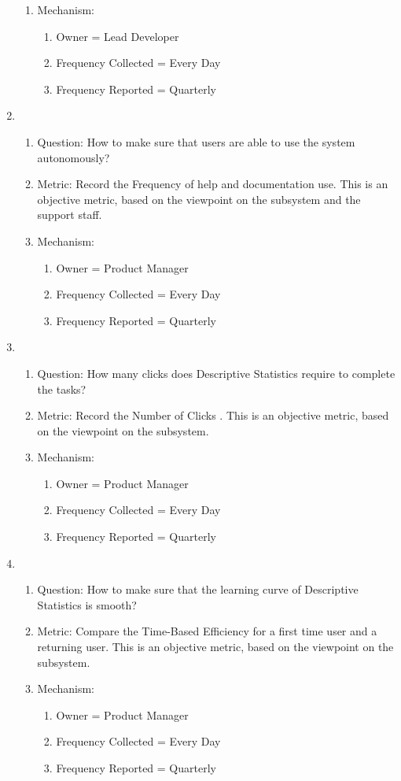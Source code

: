 \documentclass[11pt]{article}
\begin{document}
\begin{enumerate}
\begin{enumerate}
    \item Mechanism:
	\begin{enumerate}
    \item Owner = Lead Developer
    \item Frequency Collected = Every Day
    \item Frequency Reported = Quarterly
    \end{enumerate}
\end{enumerate}
\item
	\begin{enumerate}
    \item Question: How to make sure that users are able to use the system autonomously?
    \item Metric: Record the Frequency of help and documentation use. This is an objective metric, based on the viewpoint on the subsystem and the support staff.
    \item Mechanism:
	\begin{enumerate}
    \item Owner = Product Manager
    \item Frequency Collected = Every Day
    \item Frequency Reported = Quarterly
    \end{enumerate}
\end{enumerate}
\item
	\begin{enumerate}
    \item Question: How many clicks does Descriptive Statistics require to complete the tasks?
    \item Metric: Record the Number of Clicks \cite{kelkar}. This is an objective metric, based on the viewpoint on the subsystem.
    \item Mechanism:
	\begin{enumerate}
    \item Owner = Product Manager
    \item Frequency Collected = Every Day
    \item Frequency Reported = Quarterly
    \end{enumerate}
\end{enumerate}
\item
	\begin{enumerate}
    \item Question: How to make sure that the learning curve of Descriptive Statistics is smooth?
    \item Metric: Compare the Time-Based Efficiency \cite{mifsud} for a first time user and a returning user. This is an objective metric, based on the viewpoint on the subsystem.
    \item Mechanism:
	\begin{enumerate}
    \item Owner = Product Manager
    \item Frequency Collected = Every Day
    \item Frequency Reported = Quarterly
    \end{enumerate}
\end{enumerate}
\end{enumerate}
\end{document}
